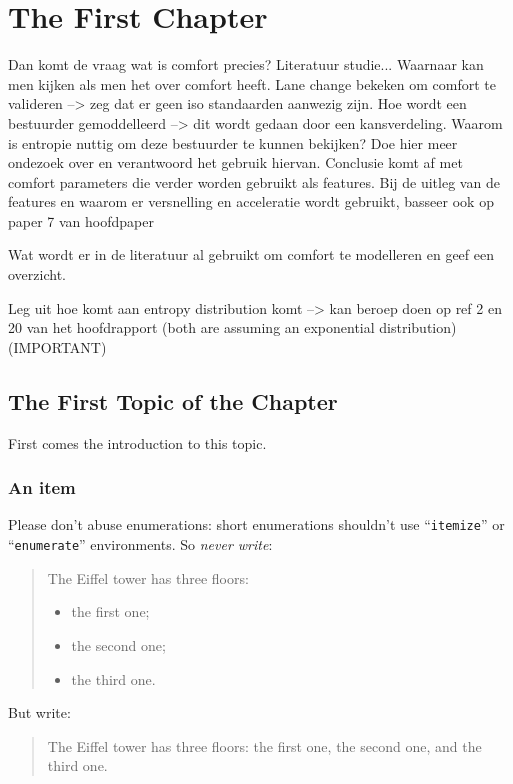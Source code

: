 \chapter{The First Chapter}
\label{cha:1}

Dan komt de vraag wat is comfort precies? Literatuur studie...
Waarnaar kan men kijken als men het over comfort heeft. 
Lane change bekeken om comfort te valideren --> zeg dat er geen iso standaarden aanwezig zijn.
Hoe wordt een bestuurder gemoddelleerd --> dit wordt gedaan door een kansverdeling.
Waarom is entropie nuttig om deze bestuurder te kunnen bekijken? Doe hier meer ondezoek over en verantwoord het gebruik hiervan. Conclusie komt af met comfort parameters die verder worden gebruikt als features.
Bij de uitleg van de features en waarom er versnelling en acceleratie wordt gebruikt, basseer ook op paper 7 van hoofdpaper

Wat wordt er in de literatuur al gebruikt om comfort te modelleren en geef een overzicht.

Leg uit hoe komt aan entropy distribution komt --> kan beroep doen op ref 2 en 20 van het hoofdrapport (both are assuming an exponential distribution) (IMPORTANT)




\section{The First Topic of the Chapter}
First comes the introduction to this topic.


\subsection{An item}
Please don't abuse enumerations: short enumerations shouldn't use
``\verb|itemize|'' or ``\texttt{enumerate}'' environments.
So \emph{never write}: 
\begin{quote}
  The Eiffel tower has three floors:
  \begin{itemize}
  \item the first one;
  \item the second one;
  \item the third one.
  \end{itemize}
\end{quote}
But write:
\begin{quote}
  The Eiffel tower has three floors: the first one, the second one, and the
  third one.
\end{quote}

